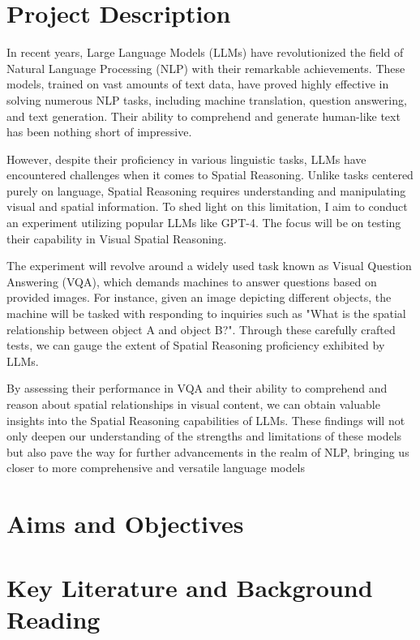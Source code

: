 \documentclass[journal,10pt]{IEEEtran}
\begin{document}

\section{Project Description}

In recent years, Large Language Models (LLMs) have revolutionized the field of Natural Language Processing (NLP) with their remarkable achievements. These models, trained on vast amounts of text data, have proved highly effective in solving numerous NLP tasks, including machine translation, question answering, and text generation. Their ability to comprehend and generate human-like text has been nothing short of impressive.

However, despite their proficiency in various linguistic tasks, LLMs have encountered challenges when it comes to Spatial Reasoning. Unlike tasks centered purely on language, Spatial Reasoning requires understanding and manipulating visual and spatial information. To shed light on this limitation, I aim to conduct an experiment utilizing popular LLMs like GPT-4. The focus will be on testing their capability in Visual Spatial Reasoning.

The experiment will revolve around a widely used task known as Visual Question Answering (VQA), which demands machines to answer questions based on provided images. For instance, given an image depicting different objects, the machine will be tasked with responding to inquiries such as "What is the spatial relationship between object A and object B?". Through these carefully crafted tests, we can gauge the extent of Spatial Reasoning proficiency exhibited by LLMs.

By assessing their performance in VQA and their ability to comprehend and reason about spatial relationships in visual content, we can obtain valuable insights into the Spatial Reasoning capabilities of LLMs. These findings will not only deepen our understanding of the strengths and limitations of these models but also pave the way for further advancements in the realm of NLP, bringing us closer to more comprehensive and versatile language models

\section{Aims and Objectives}


\section{Key Literature and Background Reading}
\cite{borji2023categorical}
\end{document}
